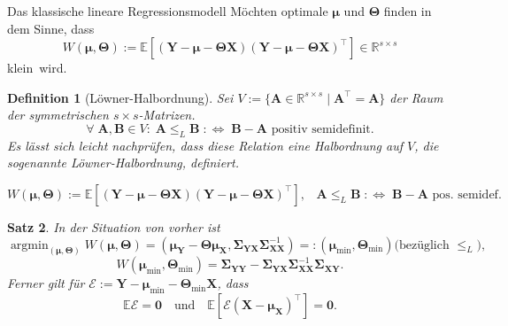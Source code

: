 \documentclass[12pt, aspectratio=169]{beamer}
\newcommand{\E}{\mathbb{E}}
\newcommand{\R}{\mathbb{R}}
\newcommand{\X}{\mathbf{X}}
\newcommand{\Y}{\mathbf{Y}}
\newcommand{\T}{\bm{\Theta}}
\newcommand{\muu}{\bm{\mu}}
\newcommand{\Ssigma}{\bm{\Sigma}}
\newcommand{\A}{\mathbf{A}}
\newcommand{\B}{\mathbf{B}}
\DeclareMathOperator*{\argmin}{argmin}
\newtheorem{ddefinition}{Definition}[section]
\newtheorem{dtheorem}[ddefinition]{Satz}
\begin{document}
\begin{frame}{Das klassische lineare Regressionsmodell}
	Möchten optimale $\muu$ und $\T$ finden in dem Sinne, dass
	$$W(\muu, \T) := \E[(\Y - \muu - \T \X)(\Y - \muu - \T \X)^\top] \in \R^{s \times s}$$ 
	\glqq klein\grqq $\,$ wird.
	\begin{ddefinition}[Löwner-Halbordnung]
		Sei $V:= \{\A \in \R^{s \times s} \;|\; \A^\top = \A \}$ der Raum der symmetrischen $s \times s$-Matrizen.
		$$\forall \; \A, \B \in V: \; \A \leq_L \B \; :\Leftrightarrow \; \B - \A \text{ positiv semidefinit.}$$
		Es lässt sich leicht nachprüfen, dass diese Relation eine Halbordnung auf $V$, die sogenannte Löwner-Halbordnung, definiert.
	\end{ddefinition}
\end{frame}

\begin{frame}
	\begin{alertblock}{}
	\begin{center}
		$W(\muu, \T) := \E[(\Y - \muu - \T \X)(\Y - \muu - \T \X)^\top] \text{,} \quad \A \leq_L \B \; :\Leftrightarrow \; \B - \A \text{ pos. semidef.}$
	\end{center}
	\end{alertblock}
	\begin{dtheorem}
		\label{thm:mr}
		In der Situation von vorher ist
		$$ \argmin_{(\muu, \T)} W(\muu, \T) = (\muu_\Y - \T \muu_\X, \Ssigma_{\Y\X} \Ssigma_{\X\X}^{-1}) =: (\muu_{\min}, \T_{\min}) \text{(bezüglich } \leq_L \text{),} $$
		$$W(\muu_{\min}, \T_{\min}) = \Ssigma_{\Y\Y} - \Ssigma_{\Y\X} \Ssigma_{\X\X}^{-1} \Ssigma_{\X\Y} \text{.}$$
		Ferner gilt für $\mathcal{E} := \Y - \muu_{\min} - \T_{\min} \X$, dass 
		$$\E \mathcal{E} = \mathbf{0} \quad \text{und} \quad \E[\mathcal{E}(\X - \muu_\X)^\top] = \mathbf{0} \text{.}$$
	\end{dtheorem}
\end{frame}
\end{document}

